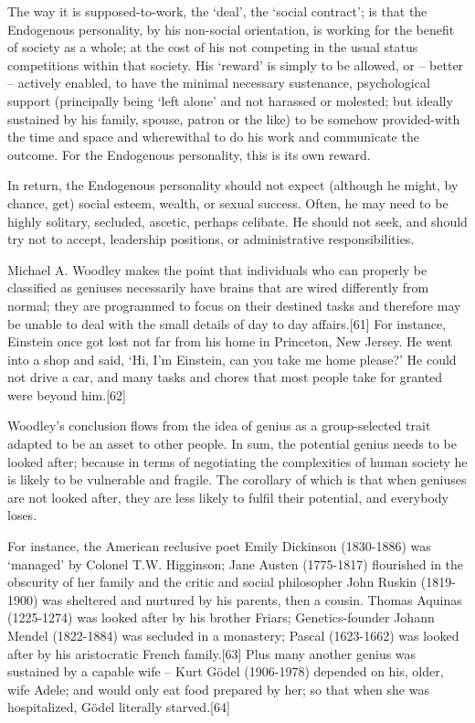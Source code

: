 \documentclass[
]{book}
\begin{document}
The way it is supposed-to-work, the `deal', the `social contract'; is that the Endogenous personality, by his non-social orientation, is working for the benefit of society as a whole; at the cost of his not competing in the usual status competitions within that society. His `reward' is simply to be allowed, or -- better -- actively enabled, to have the minimal necessary sustenance, psychological support (principally being `left alone' and not harassed or molested; but ideally sustained by his family, spouse, patron or the like) to be somehow provided-with the time and space and wherewithal to do his work and communicate the outcome. For the Endogenous personality, this is its own reward.

In return, the Endogenous personality should not expect (although he might, by chance, get) social esteem, wealth, or sexual success. Often, he may need to be highly solitary, secluded, ascetic, perhaps celibate. He should not seek, and should try not to accept, leadership positions, or administrative responsibilities.

Michael A. Woodley makes the point that individuals who can properly be classified as geniuses necessarily have brains that are wired differently from normal; they are programmed to focus on their destined tasks and therefore may be unable to deal with the small details of day to day affairs.{[}61{]} For instance, Einstein once got lost not far from his home in Princeton, New Jersey. He went into a shop and said, `Hi, I'm Einstein, can you take me home please?' He could not drive a car, and many tasks and chores that most people take for granted were beyond him.{[}62{]}

Woodley's conclusion flows from the idea of genius as a group-selected trait adapted to be an asset to other people. In sum, the potential genius needs to be looked after; because in terms of negotiating the complexities of human society he is likely to be vulnerable and fragile. The corollary of which is that when geniuses are not looked after, they are less likely to fulfil their potential, and everybody loses.

For instance, the American reclusive poet Emily Dickinson (1830-1886) was `managed' by Colonel T.W. Higginson; Jane Austen (1775-1817) flourished in the obscurity of her family and the critic and social philosopher John Ruskin (1819-1900) was sheltered and nurtured by his parents, then a cousin. Thomas Aquinas (1225-1274) was looked after by his brother Friars; Genetics-founder Johann Mendel (1822-1884) was secluded in a monastery; Pascal (1623-1662) was looked after by his aristocratic French family.{[}63{]} Plus many another genius was sustained by a capable wife -- Kurt Gödel (1906-1978) depended on his, older, wife Adele; and would only eat food prepared by her; so that when she was hospitalized, Gödel literally starved.{[}64{]}
\end{document}
